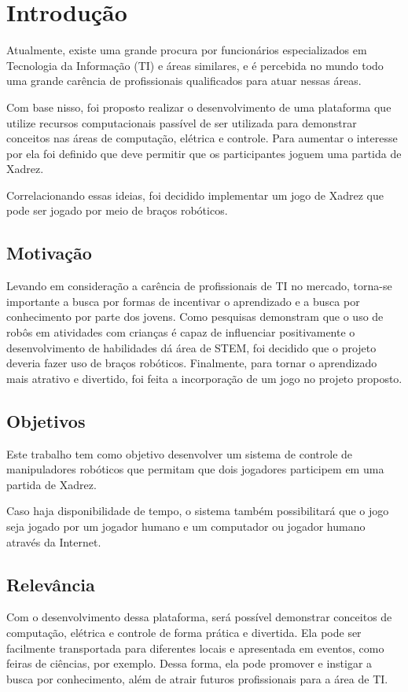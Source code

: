 \chapter[Introdução]{Introdução}
\label{cap:introducao}

Atualmente, existe uma grande procura por funcionários especializados em Tecnologia da Informação (TI) e áreas similares,
e é percebida no mundo todo uma grande carência de profissionais qualificados para atuar nessas áreas.\cite{shortage_of_workers}

Com base nisso, foi proposto realizar o desenvolvimento de uma plataforma que utilize recursos computacionais passível de ser utilizada para demonstrar conceitos nas áreas de computação, elétrica e controle.
Para aumentar o interesse por ela foi definido que deve permitir que os participantes joguem uma partida de Xadrez.

Correlacionando essas ideias, foi decidido implementar um jogo de Xadrez que pode ser jogado por meio de braços robóticos.

\section[Motivação]{Motivação}

Levando em consideração a carência de profissionais de TI no mercado, torna-se importante a busca por formas de incentivar o aprendizado e a busca por conhecimento por parte dos jovens.
Como pesquisas demonstram que o uso de robôs em atividades com crianças é capaz de influenciar positivamente o desenvolvimento de habilidades dá área de STEM\cite{technology_for_stem}, foi decidido que o projeto deveria fazer uso de braços robóticos.
Finalmente, para tornar o aprendizado mais atrativo e divertido, foi feita a incorporação de um jogo no projeto proposto.

\section[Objetivos]{Objetivos}

Este trabalho tem como objetivo desenvolver um sistema de controle de manipuladores robóticos que permitam que dois jogadores participem em uma partida de Xadrez.

Caso haja disponibilidade de tempo, o sistema também possibilitará que o jogo seja jogado por um jogador humano e um computador ou jogador humano através da Internet.

\section[Relevância]{Relevância}

Com o desenvolvimento dessa plataforma, será possível demonstrar conceitos de computação, elétrica e controle de forma prática e divertida.
Ela pode ser facilmente transportada para diferentes locais e apresentada em eventos, como feiras de ciências, por exemplo.
Dessa forma, ela pode promover e instigar a busca por conhecimento, além de atrair futuros profissionais para a área de TI.